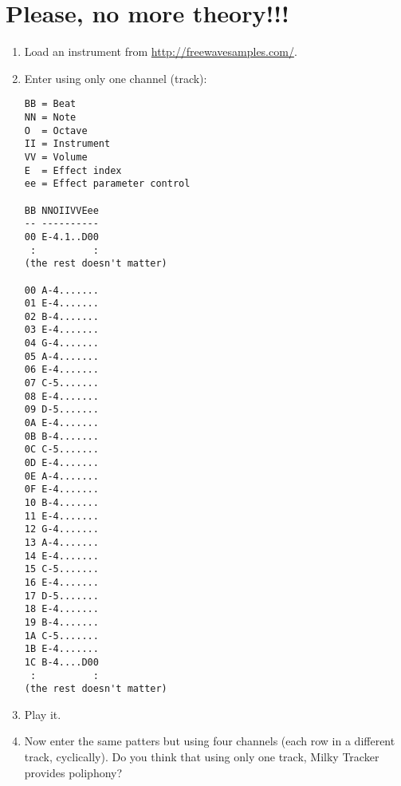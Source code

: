 \section{Please, no more theory!!!}
\begin{enumerate}
\item Load an instrument from \url{http://freewavesamples.com/}.
\item Enter using only one channel (track):
\begin{verbatim}
BB = Beat
NN = Note
O  = Octave
II = Instrument
VV = Volume
E  = Effect index
ee = Effect parameter control

BB NNOIIVVEee
-- ----------
00 E-4.1..D00
 :          :
(the rest doesn't matter)

00 A-4.......
01 E-4.......
02 B-4.......
03 E-4.......
04 G-4.......
05 A-4.......
06 E-4.......
07 C-5.......
08 E-4.......
09 D-5.......
0A E-4.......
0B B-4.......
0C C-5.......
0D E-4.......
0E A-4.......
0F E-4.......
10 B-4.......
11 E-4.......
12 G-4.......
13 A-4.......
14 E-4.......
15 C-5.......
16 E-4.......
17 D-5.......
18 E-4.......
19 B-4.......
1A C-5.......
1B E-4.......
1C B-4....D00
 :          :
(the rest doesn't matter)
\end{verbatim}

\item Play it.

\item Now enter the same patters but using four channels (each row in
  a different track, cyclically). Do you think that using only one
  track, Milky Tracker provides poliphony?

\end{enumerate}

